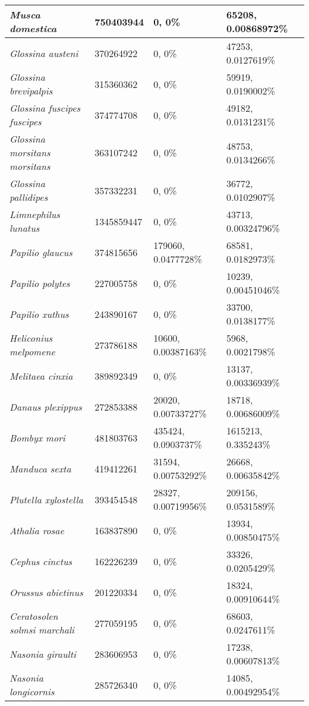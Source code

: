 {\begin{longtable}{| L{4cm} | L{2.7cm}  | L{3.7cm} | L{3.7cm} |}
\textit{Musca domestica} & 750403944 & 0, 0\% & 65208, 0.00868972\% \\ \hline
\textit{Glossina austeni} & 370264922 & 0, 0\% & 47253, 0.0127619\% \\ \hline
\textit{Glossina brevipalpis} & 315360362 & 0, 0\% & 59919, 0.0190002\% \\ \hline
\textit{Glossina fuscipes fuscipes} & 374774708 & 0, 0\% & 49182, 0.0131231\% \\ \hline
\textit{Glossina morsitans morsitans} & 363107242 & 0, 0\% & 48753, 0.0134266\% \\ \hline
\textit{Glossina pallidipes} & 357332231 & 0, 0\% & 36772, 0.0102907\% \\ \hline
\textit{Limnephilus lunatus} & 1345859447 & 0, 0\% & 43713, 0.00324796\% \\ \hline
\textit{Papilio glaucus} & 374815656 & 179060, 0.0477728\% & 68581, 0.0182973\% \\ \hline
\textit{Papilio polytes} & 227005758 & 0, 0\% & 10239, 0.00451046\% \\ \hline
\textit{Papilio xuthus} & 243890167 & 0, 0\% & 33700, 0.0138177\% \\ \hline
\textit{Heliconius melpomene} & 273786188 & 10600, 0.00387163\% & 5968, 0.0021798\% \\ \hline
\textit{Melitaea cinxia} & 389892349 & 0, 0\% & 13137, 0.00336939\% \\ \hline
\textit{Danaus plexippus} & 272853388 & 20020, 0.00733727\% & 18718, 0.00686009\% \\ \hline
\textit{Bombyx mori} & 481803763 & 435424, 0.0903737\% & 1615213, 0.335243\% \\ \hline
\textit{Manduca sexta} & 419412261 & 31594, 0.00753292\% & 26668, 0.00635842\% \\ \hline
\textit{Plutella xylostella} & 393454548 & 28327, 0.00719956\% & 209156, 0.0531589\% \\ \hline
\textit{Athalia rosae} & 163837890 & 0, 0\% & 13934, 0.00850475\% \\ \hline
\textit{Cephus cinctus} & 162226239 & 0, 0\% & 33326, 0.0205429\% \\ \hline
\textit{Orussus abietinus} & 201220334 & 0, 0\% & 18324, 0.00910644\% \\ \hline
\textit{Ceratosolen solmsi marchali} & 277059195 & 0, 0\% & 68603, 0.0247611\% \\ \hline
\textit{Nasonia giraulti} & 283606953 & 0, 0\% & 17238, 0.00607813\% \\ \hline
\textit{Nasonia longicornis} & 285726340 & 0, 0\% & 14085, 0.00492954\% \\ \hline

\end{longtable}}
